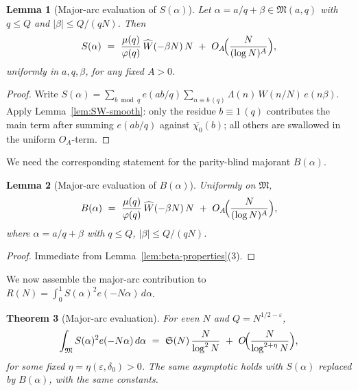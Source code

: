 \documentclass[11pt]{article}
\newtheorem{lemma}{Lemma}[part]
\newtheorem{theorem}[lemma]{Theorem}
\theoremstyle{definition}
\theoremstyle{remark}
\numberwithin{equation}{part}
\begin{document}
\begin{lemma}[Major-arc evaluation of $S(\alpha)$]\label{lem:major-S}
	Let $\alpha=a/q+\beta\in\mathfrak M(a,q)$ with $q\le Q$ and $|\beta|\le Q/(qN)$. Then
	\[
		S(\alpha)\ =\ \frac{\mu(q)}{\varphi(q)}\,\widehat W(-\beta N)\,N\ +\ O_A\!\Bigl(\frac{N}{(\log N)^{A}}\Bigr),
	\]
	uniformly in $a,q,\beta$, for any fixed $A>0$.
\end{lemma}

\begin{proof}
	Write
	\(
	S(\alpha)=\sum_{b\bmod q}\!e(ab/q)\sum_{n\equiv b\,(q)}\Lambda(n)\,W(n/N)\,e(n\beta).
	\)
	Apply Lemma~\ref{lem:SW-smooth}: only the residue $b\equiv 1\,(q)$ contributes the main term after summing $e(ab/q)$ against $\overline{\chi_0}(b)$; all others are swallowed in the uniform $O_A$-term.
\end{proof}

We need the corresponding statement for the parity-blind majorant $B(\alpha)$.

\begin{lemma}[Major-arc evaluation of $B(\alpha)$]\label{lem:major-B}
	Uniformly on $\mathfrak M$,
	\[
		B(\alpha)\ =\ \frac{\mu(q)}{\varphi(q)}\,\widehat W(-\beta N)\,N\ +\ O_A\!\Bigl(\frac{N}{(\log N)^{A}}\Bigr),
	\]
	where $\alpha=a/q+\beta$ with $q\le Q$, $|\beta|\le Q/(qN)$.
\end{lemma}

\begin{proof}
	Immediate from Lemma~\ref{lem:beta-properties}(3).
\end{proof}

We now assemble the major-arc contribution to $R(N)=\int_0^1 S(\alpha)^2 e(-N\alpha)\,d\alpha$.

\begin{theorem}[Major-arc evaluation]\label{thm:major-eval}
	For even $N$ and $Q=N^{1/2-\varepsilon}$,
	\[
		\int_{\mathfrak M} S(\alpha)^2 e(-N\alpha)\,d\alpha
		\ =\ \mathfrak S(N)\,\frac{N}{\log^2 N}\ +\ O\!\Bigl(\frac{N}{\log^{2+\eta} N}\Bigr),
	\]
	for some fixed $\eta=\eta(\varepsilon,\delta_0)>0$.
	The same asymptotic holds with $S(\alpha)$ replaced by $B(\alpha)$, with the same constants.
\end{theorem}
\end{document}
